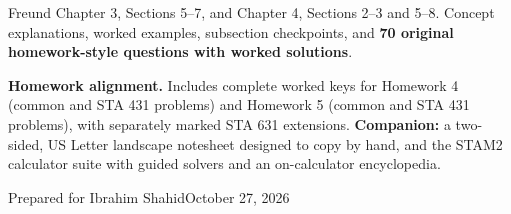 \documentclass[11pt,letterpaper]{article}
\begin{document}
\begin{titlepage}
\vspace{0.3in}{\Large Multivariate distributions\par Mathematical expectation\par}
\vspace{0.45in}
\begin{insight}
Freund Chapter 3, Sections 5--7, and Chapter 4, Sections 2--3 and 5--8. Concept explanations, worked examples, subsection checkpoints, and \textbf{70 original homework-style questions with worked solutions}.
\end{insight}
\vspace{0.15in}
\textbf{Homework alignment.} Includes complete worked keys for Homework 4 (common and STA 431 problems) and Homework 5 (common and STA 431 problems), with separately marked STA 631 extensions.
\vfill
\textbf{Companion:} a two-sided, US Letter landscape notesheet designed to copy by hand, and the STAM2 calculator suite with guided solvers and an on-calculator encyclopedia.\par
\vspace{0.15in}Prepared for Ibrahim Shahid\hfill October 27, 2026
\end{titlepage}
\tableofcontents\clearpage

\clearpage
\clearpage
\clearpage
\clearpage
\clearpage
\clearpage
\clearpage
\clearpage
\clearpage
\clearpage
\clearpage
\clearpage
\clearpage
\clearpage
\clearpage
\end{document}

